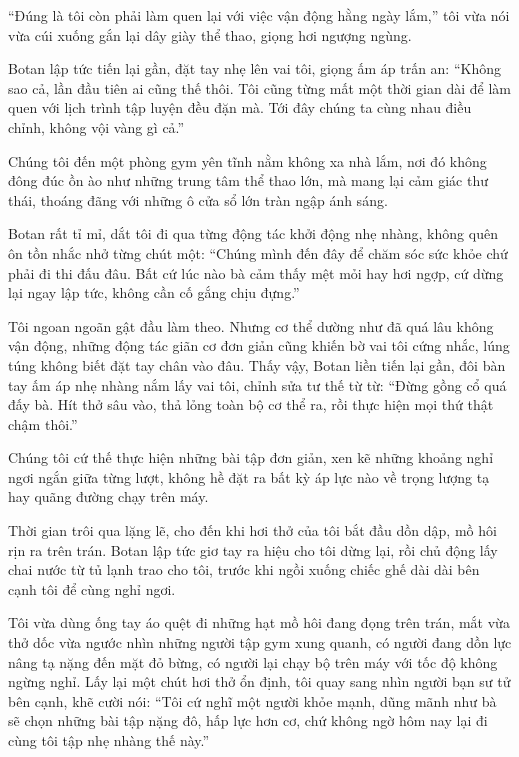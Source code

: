 \documentclass[../main.tex]{subfiles}
\begin{document}
``Đúng là tôi còn phải làm quen lại với việc vận động hằng ngày lắm,'' tôi vừa nói vừa cúi xuống gắn lại dây giày thể thao, giọng hơi ngượng ngùng.

Botan lập tức tiến lại gần, đặt tay nhẹ lên vai tôi, giọng ấm áp trấn an: ``Không sao cả, lần đầu tiên ai cũng thế thôi. Tôi cũng từng mất một thời gian dài để làm quen với lịch trình tập luyện đều đặn mà. Tới đây chúng ta cùng nhau điều chỉnh, không vội vàng gì cả.''

\ct

Chúng tôi đến một phòng gym yên tĩnh nằm không xa nhà lắm, nơi đó không đông đúc ồn ào như những trung tâm thể thao lớn, mà mang lại cảm giác thư thái, thoáng đãng với những ô cửa sổ lớn tràn ngập ánh sáng.

Botan rất tỉ mỉ, dắt tôi đi qua từng động tác khởi động nhẹ nhàng, không quên ôn tồn nhắc nhở từng chút một: ``Chúng mình đến đây để chăm sóc sức khỏe chứ phải đi thi đấu đâu. Bất cứ lúc nào bà cảm thấy mệt mỏi hay hơi ngợp, cứ dừng lại ngay lập tức, không cần cố gắng chịu đựng.''

Tôi ngoan ngoãn gật đầu làm theo. Nhưng cơ thể dường như đã quá lâu không vận động, những động tác giãn cơ đơn giản cũng khiến bờ vai tôi cứng nhắc, lúng túng không biết đặt tay chân vào đâu. Thấy vậy, Botan liền tiến lại gần, đôi bàn tay ấm áp nhẹ nhàng nắm lấy vai tôi, chỉnh sửa tư thế từ từ: ``Đừng gồng cổ quá đấy bà. Hít thở sâu vào, thả lỏng toàn bộ cơ thể ra, rồi thực hiện mọi thứ thật chậm thôi.''

Chúng tôi cứ thế thực hiện những bài tập đơn giản, xen kẽ những khoảng nghỉ ngơi ngắn giữa từng lượt, không hề đặt ra bất kỳ áp lực nào về trọng lượng tạ hay quãng đường chạy trên máy.

Thời gian trôi qua lặng lẽ, cho đến khi hơi thở của tôi bắt đầu dồn dập, mồ hôi rịn ra trên trán. Botan lập tức giơ tay ra hiệu cho tôi dừng lại, rồi chủ động lấy chai nước từ tủ lạnh trao cho tôi, trước khi ngồi xuống chiếc ghế dài dài bên cạnh tôi để cùng nghỉ ngơi.

\ct

Tôi vừa dùng ống tay áo quệt đi những hạt mồ hôi đang đọng trên trán, mắt vừa thở dốc vừa ngước nhìn những người tập gym xung quanh, có người đang dồn lực nâng tạ nặng đến mặt đỏ bừng, có người lại chạy bộ trên máy với tốc độ không ngừng nghỉ. Lấy lại một chút hơi thở ổn định, tôi quay sang nhìn người bạn sư tử bên cạnh, khẽ cười nói: ``Tôi cứ nghĩ một người khỏe mạnh, dũng mãnh như bà sẽ chọn những bài tập nặng đô, hấp lực hơn cơ, chứ không ngờ hôm nay lại đi cùng tôi tập nhẹ nhàng thế này.''
\end{document}
